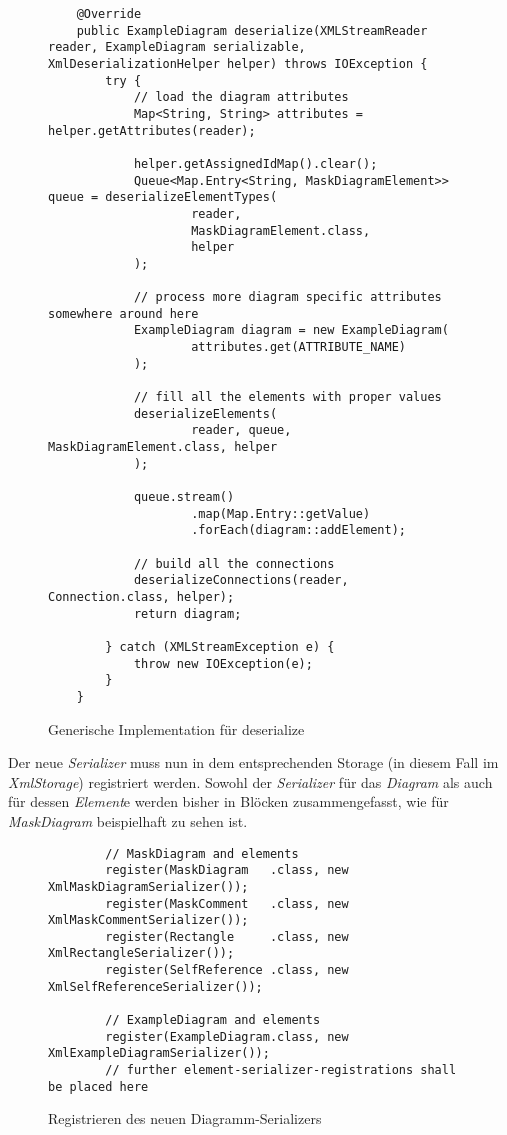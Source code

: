 \begin{figure}[H]
	\centering
	\begin{lstlisting}
    @Override
    public ExampleDiagram deserialize(XMLStreamReader reader, ExampleDiagram serializable, XmlDeserializationHelper helper) throws IOException {
        try {
            // load the diagram attributes
            Map<String, String> attributes = helper.getAttributes(reader);

            helper.getAssignedIdMap().clear();
            Queue<Map.Entry<String, MaskDiagramElement>> queue = deserializeElementTypes(
                    reader,
                    MaskDiagramElement.class,
                    helper
            );

            // process more diagram specific attributes somewhere around here
            ExampleDiagram diagram = new ExampleDiagram(
                    attributes.get(ATTRIBUTE_NAME)
            );

            // fill all the elements with proper values
            deserializeElements(
                    reader, queue, MaskDiagramElement.class, helper
            );
            
            queue.stream()
                    .map(Map.Entry::getValue)
                    .forEach(diagram::addElement);

            // build all the connections
            deserializeConnections(reader, Connection.class, helper);
            return diagram;

        } catch (XMLStreamException e) {
            throw new IOException(e);
        }
    }
	\end{lstlisting}
	\caption{Generische Implementation für deserialize}
\end{figure}

Der neue \textit{Serializer} muss nun in dem entsprechenden Storage (in diesem Fall im \textit{XmlStorage}) registriert
werden. Sowohl der \textit{Serializer} für das \textit{Diagram} als auch für dessen \textit{Element}e werden bisher in
Blöcken zusammengefasst, wie für \textit{MaskDiagram} beispielhaft zu sehen ist.

\begin{figure}[H]
	\centering
	\begin{lstlisting}
        // MaskDiagram and elements
        register(MaskDiagram   .class, new XmlMaskDiagramSerializer());
        register(MaskComment   .class, new XmlMaskCommentSerializer());
        register(Rectangle     .class, new XmlRectangleSerializer());
        register(SelfReference .class, new XmlSelfReferenceSerializer());
        
        // ExampleDiagram and elements
        register(ExampleDiagram.class, new XmlExampleDiagramSerializer());
        // further element-serializer-registrations shall be placed here
	\end{lstlisting}
	\caption{Registrieren des neuen Diagramm-Serializers}
\end{figure}


